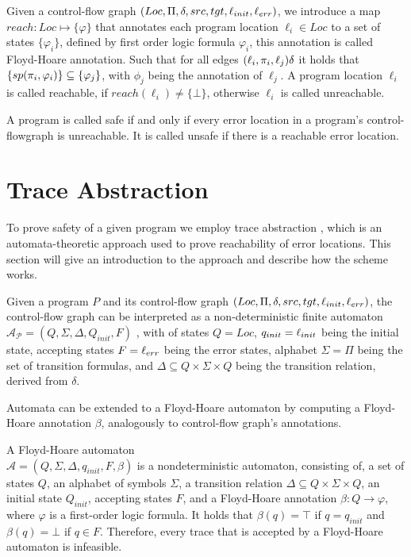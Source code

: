 \begin{mydef}
	Given a control-flow graph $(Loc, \Pi, \delta, src, tgt, \ell_{init}, \ell_{err})$, we introduce a map $reach: Loc \mapsto \{\varphi\}$ that annotates each program location $\ell_i \in Loc$ to a set of states $\{\varphi_i\}$, defined by first order logic formula $\varphi_i$, this annotation is called Floyd-Hoare annotation. Such that for all edges $(\ell_i, \pi_i, \ell_j) \delta$ it holds that $\{sp(\pi_i, \varphi_i)\} \subseteq \{\varphi_j\}$, with $\phi_j$ being the annotation of $\ell_j$.
	 A program location $\ell_i$ is called reachable, if $reach(\ell_i) \neq \{\bot\}$, otherwise $\ell_i$ is called unreachable.
\end{mydef}
A program is called safe if and only if every error location in a program's control-flowgraph is unreachable. It is called unsafe if there is a reachable error location.

\section{Trace Abstraction}
To prove safety of a given program we employ trace abstraction \cite{10.1007/978-3-642-03237-0_7, 10.1007/978-3-642-39799-8_2, 10.1145/1706299.1706353}, which is an automata-theoretic approach used to prove reachability of error locations. This section will give an introduction to the approach and describe how the scheme works. \\ \par

Given a program $P$ and its control-flow graph $(Loc, \Pi, \delta, src, tgt, \ell_{init}, \ell_{err})$, the control-flow graph can be interpreted as a non-deterministic finite automaton \\ $\mathcal{A_P} = (Q, \Sigma, \Delta, Q_{init}, F)$ , with of states $Q = Loc$, $q_{init} = \ell_{init}$ being the initial state, accepting states $F = \ell_{err}$ being the error states, alphabet $\Sigma = \Pi$ being the set of transition formulas, and $\Delta \subseteq Q \times \Sigma \times Q$ being the transition relation, derived from $\delta$. \\ \par 
Automata can be extended to a Floyd-Hoare automaton by computing a Floyd-Hoare annotation $\beta$, analogously to control-flow graph's annotations.
\begin{mydef}
	A Floyd-Hoare automaton \\$\mathcal{A} = (Q, \Sigma, \Delta, q_{init}, F, \beta)$ is a nondeterministic automaton, consisting of, a set of states $Q$, an alphabet of symbols $\Sigma$, a transition relation $\Delta \subseteq Q \times \Sigma \times Q$, an initial state $Q_{init}$, accepting states $F$, and a Floyd-Hoare annotation $\beta: Q \rightarrow \varphi$, where $\varphi$ is a first-order logic formula. It holds that $\beta(q) = \top$ if $q = q_{init}$ and $\beta(q) = \bot$ if $q \in F$. Therefore, every trace that is accepted by a Floyd-Hoare automaton is infeasible.
\end{mydef}

